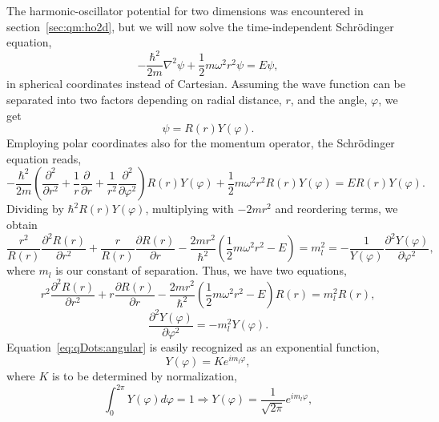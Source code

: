 The harmonic-oscillator potential for two dimensions was encountered in section~\ref{sec:qm:ho2d}, but we will now solve the time-independent Schrödinger equation,
\begin{equation}
-\frac{\hbar^2}{2m}\nabla^2 \psi + \frac{1}{2} m \omega^2 r^2 \psi 
=
E \psi ,
\end{equation}
in spherical coordinates instead of Cartesian.
Assuming the wave function can be separated into two factors depending on radial distance, $r$, and the angle, $\varphi$, we get
\begin{equation}
 \psi   = R(r) Y(\varphi).
\end{equation}
Employing polar coordinates also for the momentum operator, the Schrödinger equation reads,
\begin{equation}
-\frac{\hbar^2}{2m} 
\left(\frac{\partial^2}{\partial r^2} + \frac{1}{r}\frac{\partial}{\partial r} + \frac{1}{r^2}\frac{\partial^2}{\partial \varphi^2}\right)
 R(r) Y(\varphi) + \frac{1}{2} m \omega^2 r^2  R(r) Y(\varphi)
=
E  R(r) Y(\varphi) .
\end{equation}
Dividing by $\hbar^2 R(r) Y(\varphi)$, multiplying with $-2 m r^2$ and reordering terms, we obtain
\begin{equation}
\frac{r^2}{R(r)} 
\frac{\partial^2R(r)}{\partial r^2}
+
\frac{r}{R(r)}
\frac{\partial R(r)}{\partial r} 
-
\frac{2mr^2}{\hbar^2}
\left(\frac{1}{2} m \omega^2 r^2 - E  \right)
=
m_l^2
=
-
\frac{1}{Y(\varphi)}
\frac{\partial^2 Y(\varphi)}{\partial \varphi^2},
\end{equation}
where $m_l$ is our constant of separation.
Thus, we have two equations,
\begin{equation}
\label{eq:qDots:radial}
r^2 \frac{\partial^2R(r)}{\partial r^2}
+
r \frac{\partial R(r)}{\partial r} 
-
\frac{2mr^2}{\hbar^2 }
\left(\frac{1}{2} m \omega^2 r^2 - E  \right)R(r)
=
m_l^2 R(r) ,
\end{equation}
\begin{equation}
\label{eq:qDots:angular}
\frac{\partial^2 Y(\varphi)}{\partial \varphi^2}
=
- m_l^2 Y(\varphi) .
\end{equation}
Equation~\eqref{eq:qDots:angular} is easily recognized as an exponential function,
\begin{equation}
Y(\varphi) = Ke^{i m_l \varphi}, 
\end{equation}
where $K$ is to be determined by normalization,
\begin{equation}
\int_0^{2\pi} Y(\varphi) d\varphi = 1 
\Rightarrow 
Y(\varphi) = \frac{1}{\sqrt{2\pi}} e^{im_l \varphi},
\end{equation}
